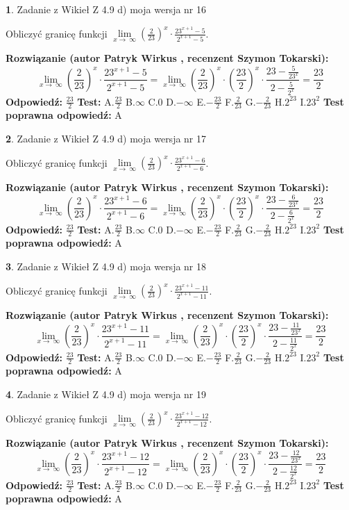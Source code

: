 \documentclass[12pt, a4paper]{article}
\theoremstyle{definition} %
\newtheorem{zad}{}
\newcommand{\zadStart}[1]{\begin{zad}#1\newline}
\newcommand{\zadStop}{\end{zad}}
\newcommand{\rozwStart}[2]{\noindent \textbf{Rozwiązanie (autor #1 , recenzent #2): }\newline}
\newcommand{\rozwStop}{\newline}
\newcommand{\odpStart}{\noindent \textbf{Odpowiedź:}\newline}
\newcommand{\odpStop}{\newline}
\newcommand{\testStart}{\noindent \textbf{Test:}\newline}
\newcommand{\testStop}{\newline}
\newcommand{\kluczStart}{\noindent \textbf{Test poprawna odpowiedź:}\newline}
\newcommand{\kluczStop}{\newline}
\begin{document}
\zadStart{Zadanie z Wikieł Z 4.9 d) moja wersja nr 16}


Obliczyć granicę funkcji  $\lim\limits_{x\to\ \infty}(\frac{2}{23})^{x}\cdot\frac{23^{x+1}-5}{2^{x+1}-5}$.
\zadStop
\rozwStart{Patryk Wirkus}{Szymon Tokarski}
$$\lim\limits_{x\to\ \infty}(\frac{2}{23})^{x}\cdot\frac{23^{x+1}-5}{2^{x+1}-5}=\lim\limits_{x\to\ \infty}(\frac{2}{23})^{x}\cdot(\frac{23}{2})^{x} \cdot \frac{23-\frac{5}{23^{x}}}{2-\frac{5}{2^{x}}} = \frac{23}{2}$$
\rozwStop
\odpStart
$\frac{23}{2}$
\odpStop
\testStart
A.$\frac{23}{2}$ B.$\infty$ C.$0$ D.$-\infty$ E.$-\frac{23}{2}$
F.$\frac{2}{23}$ G.$-\frac{2}{23}$
H.$2^{23}$
I.$23^{2}$
\testStop
\kluczStart
A
\kluczStop



\zadStart{Zadanie z Wikieł Z 4.9 d) moja wersja nr 17}


Obliczyć granicę funkcji  $\lim\limits_{x\to\ \infty}(\frac{2}{23})^{x}\cdot\frac{23^{x+1}-6}{2^{x+1}-6}$.
\zadStop
\rozwStart{Patryk Wirkus}{Szymon Tokarski}
$$\lim\limits_{x\to\ \infty}(\frac{2}{23})^{x}\cdot\frac{23^{x+1}-6}{2^{x+1}-6}=\lim\limits_{x\to\ \infty}(\frac{2}{23})^{x}\cdot(\frac{23}{2})^{x} \cdot \frac{23-\frac{6}{23^{x}}}{2-\frac{6}{2^{x}}} = \frac{23}{2}$$
\rozwStop
\odpStart
$\frac{23}{2}$
\odpStop
\testStart
A.$\frac{23}{2}$ B.$\infty$ C.$0$ D.$-\infty$ E.$-\frac{23}{2}$
F.$\frac{2}{23}$ G.$-\frac{2}{23}$
H.$2^{23}$
I.$23^{2}$
\testStop
\kluczStart
A
\kluczStop



\zadStart{Zadanie z Wikieł Z 4.9 d) moja wersja nr 18}


Obliczyć granicę funkcji  $\lim\limits_{x\to\ \infty}(\frac{2}{23})^{x}\cdot\frac{23^{x+1}-11}{2^{x+1}-11}$.
\zadStop
\rozwStart{Patryk Wirkus}{Szymon Tokarski}
$$\lim\limits_{x\to\ \infty}(\frac{2}{23})^{x}\cdot\frac{23^{x+1}-11}{2^{x+1}-11}=\lim\limits_{x\to\ \infty}(\frac{2}{23})^{x}\cdot(\frac{23}{2})^{x} \cdot \frac{23-\frac{11}{23^{x}}}{2-\frac{11}{2^{x}}} = \frac{23}{2}$$
\rozwStop
\odpStart
$\frac{23}{2}$
\odpStop
\testStart
A.$\frac{23}{2}$ B.$\infty$ C.$0$ D.$-\infty$ E.$-\frac{23}{2}$
F.$\frac{2}{23}$ G.$-\frac{2}{23}$
H.$2^{23}$
I.$23^{2}$
\testStop
\kluczStart
A
\kluczStop



\zadStart{Zadanie z Wikieł Z 4.9 d) moja wersja nr 19}


Obliczyć granicę funkcji  $\lim\limits_{x\to\ \infty}(\frac{2}{23})^{x}\cdot\frac{23^{x+1}-12}{2^{x+1}-12}$.
\zadStop
\rozwStart{Patryk Wirkus}{Szymon Tokarski}
$$\lim\limits_{x\to\ \infty}(\frac{2}{23})^{x}\cdot\frac{23^{x+1}-12}{2^{x+1}-12}=\lim\limits_{x\to\ \infty}(\frac{2}{23})^{x}\cdot(\frac{23}{2})^{x} \cdot \frac{23-\frac{12}{23^{x}}}{2-\frac{12}{2^{x}}} = \frac{23}{2}$$
\rozwStop
\odpStart
$\frac{23}{2}$
\odpStop
\testStart
A.$\frac{23}{2}$ B.$\infty$ C.$0$ D.$-\infty$ E.$-\frac{23}{2}$
F.$\frac{2}{23}$ G.$-\frac{2}{23}$
H.$2^{23}$
I.$23^{2}$
\testStop
\kluczStart
A
\kluczStop
\end{document}
